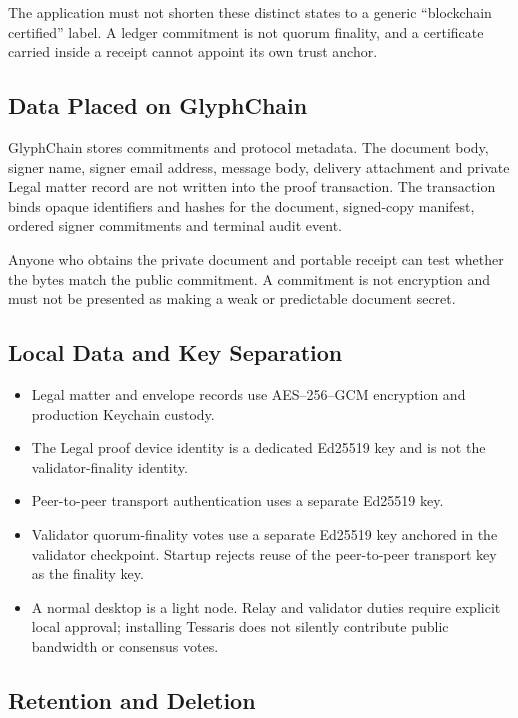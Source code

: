 The application must not shorten these distinct states to a generic
``blockchain certified'' label.  A ledger commitment is not quorum finality,
and a certificate carried inside a receipt cannot appoint its own trust anchor.

\subsection{Data Placed on GlyphChain}

GlyphChain stores commitments and protocol metadata.  The document body,
signer name, signer email address, message body, delivery attachment and private
Legal matter record are not written into the proof transaction.  The
transaction binds opaque identifiers and hashes for the document, signed-copy
manifest, ordered signer commitments and terminal audit event.

Anyone who obtains the private document and portable receipt can test whether
the bytes match the public commitment.  A commitment is not encryption and
must not be presented as making a weak or predictable document secret.

\subsection{Local Data and Key Separation}

\begin{itemize}[leftmargin=*]
  \item Legal matter and envelope records use AES--256--GCM encryption and
        production Keychain custody.
  \item The Legal proof device identity is a dedicated Ed25519 key and is not
        the validator-finality identity.
  \item Peer-to-peer transport authentication uses a separate Ed25519 key.
  \item Validator quorum-finality votes use a separate Ed25519 key anchored in
        the validator checkpoint.  Startup rejects reuse of the peer-to-peer
        transport key as the finality key.
  \item A normal desktop is a light node.  Relay and validator duties require
        explicit local approval; installing Tessaris does not silently
        contribute public bandwidth or consensus votes.
\end{itemize}

\subsection{Retention and Deletion}

